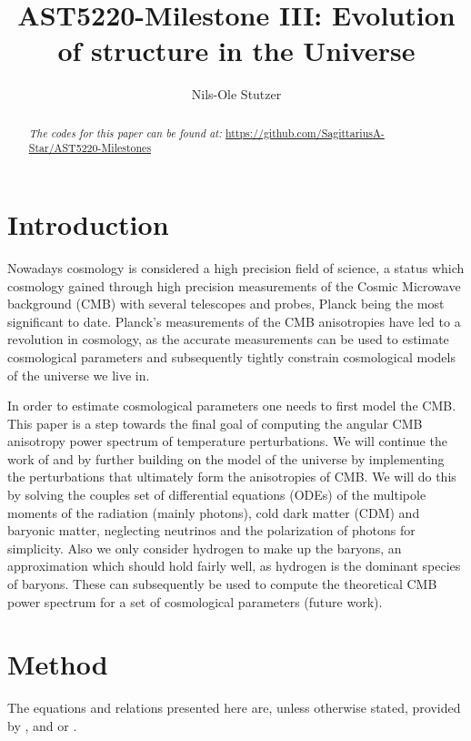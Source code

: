 \documentclass[twocolumn]{aastex62}
\begin{document}
\title{\Large AST5220-Milestone III: Evolution of structure in the Universe}

\author{Nils-Ole Stutzer}

\begin{abstract}
    
    \textit{The codes for this paper can be found at:} \newline \url{https://github.com/SagittariusA-Star/AST5220-Milestones}
\end{abstract}

\section{Introduction} \label{sec:Intro}
Nowadays cosmology is considered a high precision field of science, a status which cosmology gained through high precision measurements of the Cosmic Microwave background (CMB) with several telescopes and probes, Planck \citep[]{planckcollaboration:2018} being the most significant to date. Planck's measurements of the CMB anisotropies have led to a revolution in cosmology, as the accurate measurements can be used to estimate cosmological parameters and subsequently tightly constrain cosmological models of the universe we live in.

In order to estimate cosmological parameters one needs to first model the CMB. This paper is a step towards the final goal of computing the angular CMB anisotropy power spectrum of temperature perturbations. We will continue the work of \cite{stutzer:2020a} and \cite{stutzer:2020b} by further building on the model of the universe by implementing the perturbations that ultimately form the anisotropies of CMB. We will do this by solving the couples set of differential equations (ODEs) of the multipole moments of the radiation (mainly photons), cold dark matter (CDM) and baryonic matter, neglecting neutrinos and the polarization of photons for simplicity. Also we only consider hydrogen to make up the baryons, an approximation which should hold fairly well, as hydrogen is the dominant species of baryons. These can subsequently be used to compute the theoretical CMB power spectrum for a set of cosmological parameters (future work).

\section{Method} \label{sec:Method}
The equations and relations presented here are, unless otherwise stated, provided by \cite{callin:2006}, \cite{winther:2020b} and or \cite{dodelson:2003}.
\end{document}
